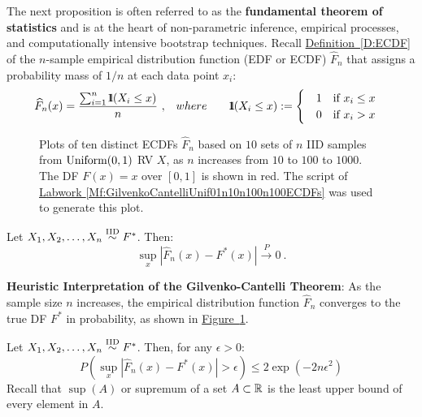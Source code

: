 The next proposition is often referred to as the {\bf fundamental theorem of statistics} and is at the heart of non-parametric inference, empirical processes, and computationally intensive bootstrap techniques.  Recall  \hyperref[D:ECDF]{Definition~\ref*{D:ECDF}} of the $n$-sample empirical distribution function (EDF or ECDF) $\widehat{F}_n$ that assigns a probability mass of $1/n$ at each data point $x_i$:
\begin{eqnarray*} %
\widehat{F}_n(x) = \frac{ \sum_{i=1}^n \BB{1}(X_i \leq x) }{n} \ ,  & \quad where \qquad
\BB{1}(X_i \leq x) :=
\begin{cases}
& 1  \quad \text{if $x_i \leq x$} \\
& 0  \quad \text{if $x_i > x$} 
\end{cases}
\end{eqnarray*}

\begin{figure}[htpb]
\caption{Plots of ten distinct ECDFs $\widehat{F}_n$ based on $10$ sets of $n$ IID samples from $\mbox{{\rm Uniform}}(0,1)$ RV $X$, as $n$ increases from $10$ to $100$ to $1000$.  The DF $F(x)=x$ over $[0,1]$ is shown in red.  The script of \hyperref[Mf:GilvenkoCantelliUnif01n10n100n100ECDFs]{Labwork \ref*{Mf:GilvenkoCantelliUnif01n10n100n100ECDFs}} was used to generate this plot.   \label{F:GilvenkoCantelliUnif01n10n100n100ECDFs}}
\centering   {}
\end{figure}
\begin{prop}\label{P:Gilvenko-Cantelli}
Let $X_1,X_2,\ldots,X_n \overset{{\rm IID}}{\sim} F^*$.  Then:
\[
\sup_x { | \widehat{F}_n(x) - F^*(x) | } \overset{P}{\longrightarrow} 0 \ .
\]
\end{prop}
{\bf Heuristic Interpretation of the Gilvenko-Cantelli Theorem}:  As the sample size $n$ increases, the empirical distribution function $\widehat{F}_n$ converges to the true DF $F^*$ in probability, as shown in \hyperref[F:GilvenkoCantelliUnif01n10n100n100ECDFs]{Figure~\ref*{F:GilvenkoCantelliUnif01n10n100n100ECDFs}}.

\begin{prop}
Let $X_1,X_2,\ldots,X_n \overset{{\rm IID}}{\sim} F^*$.  Then, for any $\epsilon>0$:
\begin{equation}\label{E:DKWNeq}
P \left( \sup_x | \widehat{F}_n(x) - F^*(x) | > \epsilon  \right) \leq 2 \exp {(-2 n \epsilon^2)}
\end{equation}
Recall that $\sup(A)$ or supremum of a set $A \subset \mathbb{R}$ is the least upper bound of every element in $A$.
\end{prop}

